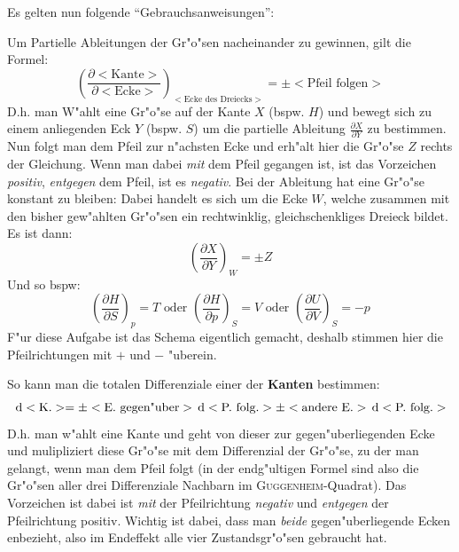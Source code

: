 Es gelten nun folgende "`Gebrauchsanweisungen"':
\begin{description}[\setlabelstyle{\bfseries\slshape}]
\item[Ableitungen] Um Partielle Ableitungen der Gr"o"sen nacheinander zu
   gewinnen, gilt die Formel:
   \begin{equation}
      \label{eq:430}
      \left ( \frac{\partial <\text{Kante}>}{\partial <\text{Ecke}>} \right )_{<\text{Ecke
          des Dreiecks}>} = \pm <\text{Pfeil folgen}>
   \end{equation}
D.h. man W"ahlt eine Gr"o"se auf der Kante $X$ (bspw. $H$) und bewegt sich zu
einem anliegenden Eck $Y$ (bspw. $S$) um die partielle Ableitung
$\frac{\partial X}{\partial Y}$ zu bestimmen. Nun folgt man dem Pfeil
zur n"achsten Ecke und erh"alt hier die Gr"o"se $Z$ rechts der
Gleichung. Wenn man dabei \emph{mit} dem Pfeil gegangen ist, ist das
Vorzeichen \emph{positiv}, \emph{entgegen} dem Pfeil, ist es
\emph{negativ}. Bei der Ableitung hat eine Gr"o"se konstant zu bleiben:
Dabei handelt es sich um die Ecke $W$, welche zusammen mit den bisher
gew"ahlten Gr"o"sen ein rechtwinklig, gleichschenkliges Dreieck
bildet. Es ist dann:
\begin{equation*}
\left (   \frac{\partial X}{\partial Y} \right )_W = \pm Z
\end{equation*}
Und so bspw:
\begin{equation*}
   \left ( \frac{\partial H}{\partial S} \right )_p = T 
\text{ oder }
\left ( \frac{\partial H}{\partial p} \right )_S = V
\text{ oder }
\left ( \frac{\partial U}{\partial V} \right )_S = -p
\end{equation*}
F"ur diese Aufgabe ist das Schema eigentlich gemacht, deshalb stimmen
hier die Pfeilrichtungen mit $+$ und $-$ "uberein.
\item[Totale Differenziale] 
So kann man die totalen Differenziale einer der \textbf{Kanten}
bestimmen:
\begin{equation}
   \label{eq:431}
 \, \mathrm{d}  <\text{K.}> = \pm <\text{E. gegen"uber}> \, \mathrm{d}
 <\text{P. folg.}> \pm <\text{andere E.}> \, \mathrm{d} <\text{P. folg.}>
\end{equation}
D.h. man w"ahlt eine Kante und geht von dieser zur gegen"uberliegenden
Ecke und mulipliziert diese Gr"o"se mit dem Differenzial der Gr"o"se, zu
der man gelangt, wenn man dem Pfeil folgt (in der endg"ultigen Formel
sind also die Gr"o"sen aller drei Differenziale Nachbarn im
\textsc{Guggenheim}-Quadrat). Das Vorzeichen ist dabei ist \emph{mit}
der Pfeilrichtung \emph{negativ} und \emph{entgegen} der Pfeilrichtung
positiv. Wichtig ist dabei, dass man \emph{beide} gegen"uberliegende
Ecken enbezieht, also im Endeffekt alle vier Zustandsgr"o"sen gebraucht
hat.


\end{description}
